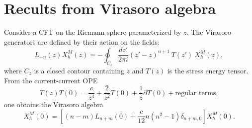 \documentclass[a4paper,11pt]{article}
\begin{document}
\appendix
\section{Recults from Virasoro algebra}\label{app_ward}

Consider a CFT on the Riemann sphere parameterized by $z$.
The Virasoro generators are defined by their action on the fields:
\begin{equation}
\label{vir_ln}
 L_{-n}(z)X^{M}_h(z)=-\oint_{C_{z}}\frac{dz'}{2\pi i}(z'-z)^{n+1}~T(z')~X^{M}_h(z),
\end{equation}
where $C_{z}$ is a closed contour containing $z$ and $T(z)$ is the stress energy tensor. 
From the current-current OPE
\begin{equation}
T(z) T(0)= \frac{c}{z^4}+ \frac{2}{z^2} T(0)+\frac{1}{z}\partial T (0)+\text{regular terms},
\end{equation} 
one obtains the  Virasoro algebra
\begin{equation}
 [L_n(0), L_{m}(0)]X^{M}_h(0) =\left[(n-m) L_{n+m}(0)+\frac{c}{12}n(n^2-1)\delta_{n+m, 0}\right]X^{M}_h(0).
\end{equation}
\end{document}
